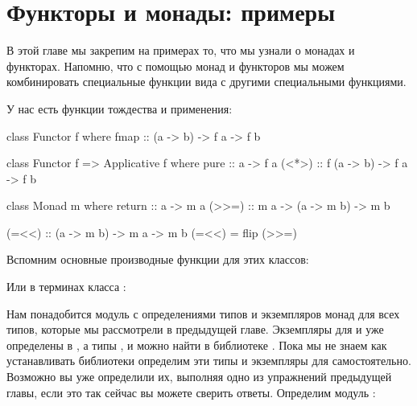 \setcounter{chapter}{6}
\chapter{Функторы и монады: примеры}

В этой главе мы закрепим на примерах то, что мы 
узнали о монадах и функторах. Напомню, что 
с помощью монад и функторов мы можем комбинировать 
специальные функции вида 
с другими специальными функциями.

У нас есть функции тождества и применения:

\begin{code}
class Functor f where
    fmap :: (a -> b) -> f a -> f b

class Functor f => Applicative f where
    pure    :: a -> f a
    (<*>)   :: f (a -> b) -> f a -> f b

class Monad m where
    return  :: a -> m a
    (>>=)   :: m a -> (a -> m b) -> m b

(=<<) :: (a -> m b) -> m a -> m b
(=<<) = flip (>>=)
\end{code}

Вспомним основные производные функции для этих классов:

Или в терминах класса :


Нам понадобится модуль с определениями типов и 
экземпляров монад для всех типов, которые мы рассмотрели
в предыдущей главе. Экземпляры для \In{[]} и 
уже определены в , а типы , 
 и  можно найти в библиотеке
. Пока мы не знаем как устанавливать библиотеки
определим эти типы и экземпляры для  
самостоятельно. Возможно вы уже определили их, выполняя
одно из упражнений предыдущей главы, если это
так сейчас вы можете сверить ответы. Определим 
модуль :

